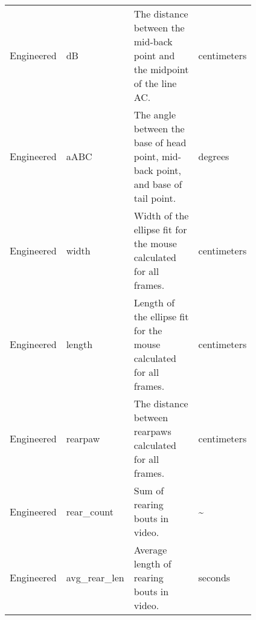 \documentclass[11pt,reqno]{amsart}
\begin{document}
\begin{table}
\begin{tabular}{p{0.1\linewidth} | p{0.18\linewidth}| p{0.45\linewidth}| p{0.08\linewidth}}
Engineered       & dB                       & The distance between the mid-back point and the midpoint of the line AC.                                                                                                                                                                                                                & centimeters         \\[.5cm]
Engineered       & aABC                     & The angle between the base of head point, mid-back point, and base of tail point.                                                                                                                                                                                                       & degrees             \\[.5cm]
Engineered       & width                    & Width of the ellipse fit for the mouse calculated for all frames.                                                                                                                                                                                                                       & centimeters         \\[.5cm]
Engineered       & length                   & Length of the ellipse fit for the mouse calculated for all frames.                                                                                                                                                                                                                      & centimeters         \\[.5cm]
Engineered       & rearpaw                  & The distance between rearpaws calculated for all frames.                                                                                                                                                                                                                                & centimeters         \\[.3cm]
Engineered       & rear\_count              & Sum of rearing bouts in video.                                                                                                                                                                                                                                                          & \textasciitilde{}   \\[.4cm]
Engineered       & avg\_rear\_len           & Average length of rearing bouts in video.                                                                                                                                                                                                                                               & seconds            
\end{tabular}
\end{table}
\end{document}
